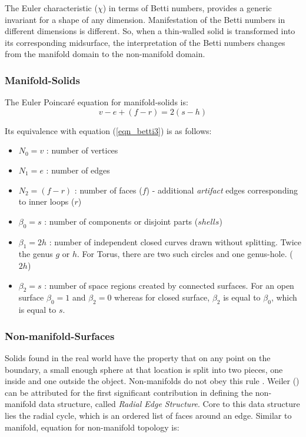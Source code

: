 The Euler characteristic ($\chi$) in terms of Betti numbers, provides a generic invariant for a shape of any dimension. Manifestation of the Betti numbers in different dimensions is different. So, when a thin-walled solid is transformed into its corresponding midsurface, the interpretation of the Betti numbers changes from the manifold domain to the non-manifold domain.

\subsubsection{Manifold-Solids}
The Euler Poincar\'e equation for manifold-solids is:
\begin{equation}
v - e + (f - r) = 2 (s - h)
\label{eqn_manifold}
\end{equation}

Its equivalence with equation (\ref{eqn_betti3}) is as follows:

\begin{itemize}
[noitemsep,topsep=2pt,parsep=2pt,partopsep=2pt,label={}]
\item $N_{0} = v $ : number of vertices
\item $N_{1} = e $ : number of edges
\item $N_{2} = (f - r)$ : number of faces ($f$) - additional {\em artifact} edges corresponding to inner loops ($r$)
\item $\beta_{0} = s$ : number of components or disjoint parts ($shells$)
\item $\beta_{1} = 2h$ : number of independent closed curves drawn without splitting. Twice the genus $g$ or $h$. For Torus, there are two such circles and one genus-hole. ($2h$)
\item $\beta_{2} = s$ : number of space regions created by connected surfaces. For an open surface $\beta_{0} = 1$ and $\beta_{2}=0$ whereas for closed surface,  $\beta_{2}$ is equal to $\beta_{0}$,  which is equal to $s$.
\end{itemize}

\subsubsection{Non-manifold-Surfaces}
Solids found in the real world have the property that on any point on the boundary, a small enough sphere at that location is split into two pieces, one inside and one outside the object. Non-manifolds do not obey this rule \cite{Krishnamurti2002}. Weiler (\cite{Weiler1986}) can be attributed for the first significant contribution in defining the non-manifold data structure, called {\em Radial Edge Structure}. Core to this data structure lies the radial cycle, which is an ordered list of faces around an edge. Similar to manifold, equation for non-manifold topology \cite{Yamaguchi2002} is: 

